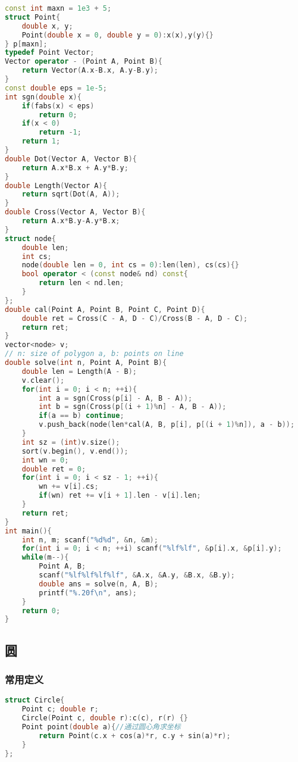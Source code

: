 \begin{lstlisting}[language=C++]
const int maxn = 1e3 + 5;
struct Point{
    double x, y;
    Point(double x = 0, double y = 0):x(x),y(y){}
} p[maxn];
typedef Point Vector;
Vector operator - (Point A, Point B){
    return Vector(A.x-B.x, A.y-B.y);
}
const double eps = 1e-5;
int sgn(double x){
    if(fabs(x) < eps)
        return 0;
    if(x < 0)
        return -1;
    return 1;
}
double Dot(Vector A, Vector B){
    return A.x*B.x + A.y*B.y;
}
double Length(Vector A){
    return sqrt(Dot(A, A));
}
double Cross(Vector A, Vector B){
    return A.x*B.y-A.y*B.x;
}
struct node{
    double len;
    int cs;
    node(double len = 0, int cs = 0):len(len), cs(cs){}
    bool operator < (const node& nd) const{
        return len < nd.len;
    }
};
double cal(Point A, Point B, Point C, Point D){
    double ret = Cross(C - A, D - C)/Cross(B - A, D - C);
    return ret;
}
vector<node> v;
// n: size of polygon a, b: points on line
double solve(int n, Point A, Point B){
    double len = Length(A - B);
    v.clear();
    for(int i = 0; i < n; ++i){
        int a = sgn(Cross(p[i] - A, B - A));
        int b = sgn(Cross(p[(i + 1)%n] - A, B - A));
        if(a == b) continue;
        v.push_back(node(len*cal(A, B, p[i], p[(i + 1)%n]), a - b));
    }
    int sz = (int)v.size();
    sort(v.begin(), v.end());
    int wn = 0;
    double ret = 0;
    for(int i = 0; i < sz - 1; ++i){
        wn += v[i].cs;
        if(wn) ret += v[i + 1].len - v[i].len;
    }
    return ret;
}
int main(){
    int n, m; scanf("%d%d", &n, &m);
    for(int i = 0; i < n; ++i) scanf("%lf%lf", &p[i].x, &p[i].y);
    while(m--){
        Point A, B;
        scanf("%lf%lf%lf%lf", &A.x, &A.y, &B.x, &B.y);
        double ans = solve(n, A, B);
        printf("%.20f\n", ans);
    }
    return 0;
}
\end{lstlisting}

\subsection{圆}

\subsubsection{常用定义}

\begin{lstlisting}[language=C++]
struct Circle{
    Point c; double r;
    Circle(Point c, double r):c(c), r(r) {}
    Point point(double a){//通过圆心角求坐标
        return Point(c.x + cos(a)*r, c.y + sin(a)*r);
    }
};
\end{lstlisting}

